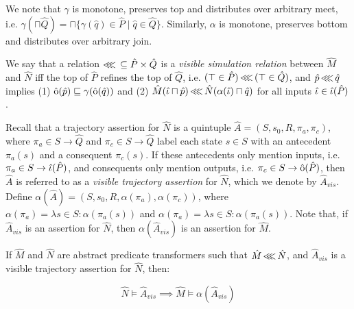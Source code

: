 \noindent We note that $\gamma$ is monotone, preserves top and distributes over arbitrary meet, i.e. $\gamma(\sqcap \hat Q) = \sqcap \{ \gamma(\hat q) \in \hat P \mid \hat q \in \hat Q\}$. Similarly, $\alpha$ is monotone, preserves bottom and distributes over arbitrary join.

We say that a relation $\operatorname{\lll} \, \subseteq \hat P \times \hat Q$ is a \textit{visible simulation relation} between $\hat M$ and $\hat N$ iff the top of $\hat P$ refines the top of $\hat Q$, i.e. $(\top \in \hat P) \operatorname{\lll} \, (\top \in \hat Q)$, and $\hat p \operatorname{\lll} \hat q$ implies (1) $\operatorname{\hat{\mathrm{o}}}(\hat p) \sqsubseteq \gamma(\operatorname{\hat{\mathrm{o}}}(\hat q))$ and (2) $\hat M(\hat \iota \sqcap \hat p) \operatorname{\lll} \hat N(\alpha(\hat \iota) \sqcap \hat q)$ for all inputs $\hat \iota \in \operatorname{\hat{\iota}}(\hat P)$.

Recall that a trajectory assertion for $\hat N$ is a quintuple $\hat A = (S, s_{0}, R, \pi_{a}, \pi_{c})$, where $\pi_{a} \in S \rightarrow \hat Q$ and $\pi_{c} \in S \rightarrow \hat Q$ label each state $s \in S$ with an antecedent $\pi_{a}(s)$ and a consequent $\pi_{c}(s)$. If these antecedents only mention inputs, i.e. $\pi_{a} \in S \rightarrow \operatorname{\hat{\iota}}(\hat P)$, and consequents only mention outputs, i.e. $\pi_{c} \in S \rightarrow \operatorname{\hat{\mathrm{o}}}(\hat P)$, then $\hat A$ is referred to as a \textit{visible trajectory assertion} for $\hat N$, which we denote by $\hat A_{vis}$. Define $\alpha(\hat A) = (S, s_{0}, R, \alpha(\pi_{a}), \alpha(\pi_{c}))$, where $\alpha(\pi_{a}) = \lambda s \in S : \alpha(\pi_{a}(s))$ and $\alpha(\pi_{a}) = \lambda s \in S : \alpha(\pi_{a}(s))$. Note that, if $\hat A_{vis}$ is an assertion for $\hat N$, then $\alpha(\hat A_{vis})$ is an assertion for $\hat M$.

\begin{theorem}
\label{thm:refinement}
If $\hat M$ and $\hat N$ are abstract predicate transformers such that $\hat M \operatorname{\lll} \hat N$, and $\hat A_{vis}$ is a visible trajectory assertion for $\hat N$, then:

\begin{equation*}
\hat N \models \hat A_{vis} \implies \hat M \models \alpha(\hat A_{vis})
\end{equation*}
\end{theorem}
